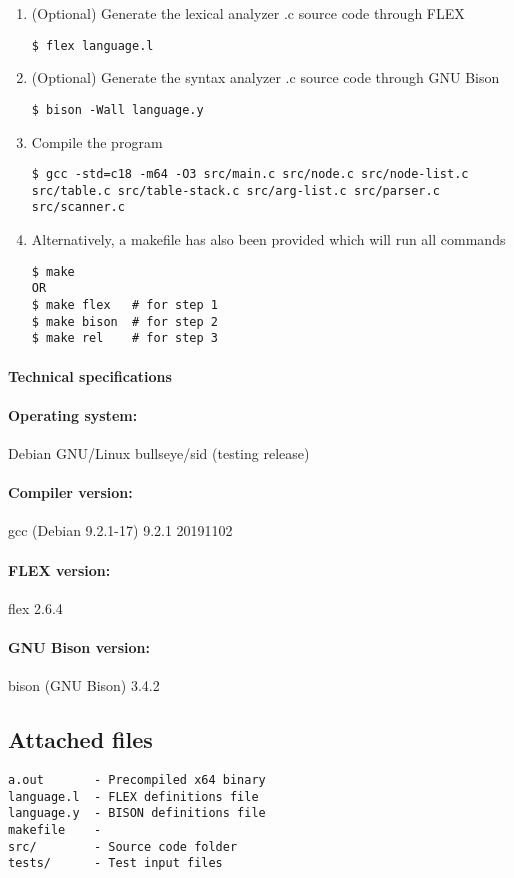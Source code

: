 \documentclass[12pt]{article}
\begin{document}
\begin{enumerate}
\item (Optional) Generate the lexical analyzer .c source code through FLEX
\begin{lstlisting}
$ flex language.l
\end{lstlisting}

\item (Optional) Generate the syntax analyzer .c source code through GNU Bison
\begin{lstlisting}
$ bison -Wall language.y
\end{lstlisting}

\item Compile the program
\begin{lstlisting}
$ gcc -std=c18 -m64 -O3 src/main.c src/node.c src/node-list.c src/table.c src/table-stack.c src/arg-list.c src/parser.c src/scanner.c
\end{lstlisting}

\item Alternatively, a makefile has also been provided which will run all commands
\begin{lstlisting}
$ make
OR
$ make flex   # for step 1
$ make bison  # for step 2
$ make rel    # for step 3
\end{lstlisting}
\end{enumerate}

\paragraph{Technical specifications}
\paragraph{Operating system:} Debian GNU/Linux bullseye/sid (testing release)
\paragraph{Compiler version:} gcc (Debian 9.2.1-17) 9.2.1 20191102
\paragraph{FLEX version:} flex 2.6.4
\paragraph{GNU Bison version:} bison (GNU Bison) 3.4.2

\subsection{Attached files}
\begin{lstlisting}
a.out       - Precompiled x64 binary
language.l  - FLEX definitions file
language.y  - BISON definitions file
makefile    - 
src/        - Source code folder
tests/      - Test input files
\end{lstlisting}
\end{document}
